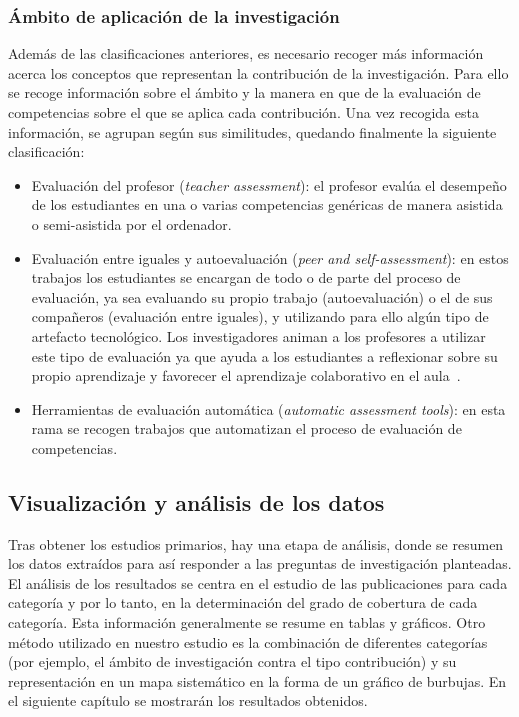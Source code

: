 \subsubsection{Ámbito de aplicación de la investigación}
Además de las clasificaciones anteriores, es necesario recoger más información acerca los conceptos que representan la contribución de la investigación. Para ello se recoge información sobre el ámbito y la manera en que de la evaluación de competencias sobre el que se aplica cada contribución. Una vez recogida esta información, se agrupan según sus similitudes, quedando finalmente la siguiente clasificación:
\begin{itemize}
\item Evaluación del profesor (\emph{teacher assessment}): el profesor evalúa el desempeño de los estudiantes en una o varias competencias genéricas de manera asistida o semi-asistida por el ordenador.
\item Evaluación entre iguales y autoevaluación (\emph{peer and self-assessment}): en estos trabajos los estudiantes se encargan de todo o de parte del proceso de evaluación, ya sea evaluando su propio trabajo (autoevaluación) o el de sus compañeros (evaluación entre iguales), y utilizando para ello algún tipo de artefacto tecnológico. Los investigadores animan a los profesores a utilizar este tipo de evaluación ya que ayuda a los estudiantes a reflexionar sobre su propio aprendizaje y favorecer el aprendizaje colaborativo en el aula~\cite{chen2010implementation}.
\item Herramientas de evaluación automática (\emph{automatic assessment tools}): en esta rama se recogen trabajos que automatizan el proceso de evaluación de competencias.
\end{itemize}

\subsection{Visualización y análisis de los datos}
Tras obtener los estudios primarios, hay una etapa de análisis, donde se resumen los datos extraídos para así responder a las preguntas de investigación planteadas. El análisis de los resultados se centra en el estudio de las publicaciones para cada categoría y por lo tanto, en la determinación del grado de cobertura de cada categoría. Esta información generalmente se resume en tablas y gráficos. Otro método utilizado en nuestro estudio es la combinación de diferentes categorías (por ejemplo, el ámbito de investigación contra el tipo contribución) y su representación en un mapa sistemático en la forma de un gráfico de burbujas.
En el siguiente capítulo se mostrarán los resultados obtenidos.

